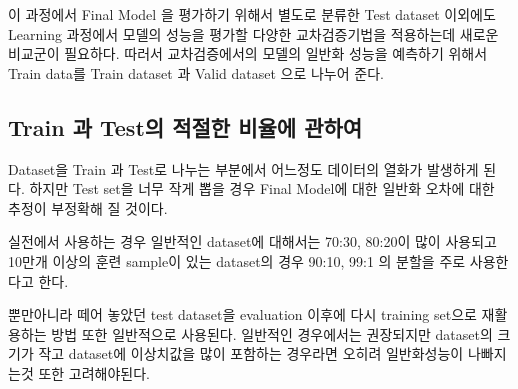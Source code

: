     이 과정에서 Final Model 을 평가하기 위해서 별도로 분류한 Test dataset 이외에도 Learning 과정에서 모델의 성능을 평가할 다양한 교차검증기법을 적용하는데 새로운 비교군이 필요하다. 따러서 교차검증에서의 모델의 일반화 성능을 예측하기 위해서 Train data를 Train dataset 과 Valid dataset 으로 나누어 준다.
\subsection{Train 과 Test의 적절한 비율에 관하여}
    Dataset을 Train 과 Test로 나누는 부분에서 어느정도 데이터의 열화가 발생하게 된다. 하지만 Test set을 너무 작게 뽑을 경우 Final Model에 대한 일반화 오차에 대한 추정이 부정확해 질 것이다. 
    
    실전에서 사용하는 경우 일반적인 dataset에 대해서는 70:30, 80:20이 많이 사용되고 10만개 이상의 훈련  sample이 있는 dataset의 경우 90:10, 99:1 의 분할을 주로 사용한다고 한다.
    
    뿐만아니라 떼어 놓았던 test dataset을 evaluation 이후에 다시 training set으로 재활용하는 방법 또한 일반적으로 사용된다. 일반적인 경우에서는 권장되지만 dataset의 크기가 작고 dataset에 이상치값을 많이 포함하는 경우라면 오히려 일반화성능이 나빠지는것 또한 고려해야된다.
\clearpage